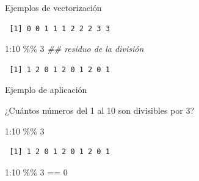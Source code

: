 \documentclass[
  ignorenonframetext,
  aspectratio=169,
  spanish,
]{beamer}
\newenvironment{Shaded}{\begin{snugshade}}{\end{snugshade}}
\newcommand{\DecValTok}[1]{\textcolor[rgb]{0.68,0.00,0.00}{#1}}
\newcommand{\DocumentationTok}[1]{\textcolor[rgb]{0.37,0.37,0.37}{\textit{#1}}}
\newcommand{\SpecialCharTok}[1]{\textcolor[rgb]{0.37,0.37,0.37}{#1}}
\begin{document}
\begin{frame}[fragile]{Ejemplos de vectorización}
\begin{verbatim}
 [1] 0 0 1 1 1 2 2 2 3 3
\end{verbatim}

\begin{Shaded}
\begin{Highlighting}[]
\DecValTok{1}\SpecialCharTok{:}\DecValTok{10} \SpecialCharTok{\%\%} \DecValTok{3} \DocumentationTok{\#\# residuo de la división}
\end{Highlighting}
\end{Shaded}

\begin{verbatim}
 [1] 1 2 0 1 2 0 1 2 0 1
\end{verbatim}
\end{frame}

\begin{frame}[fragile]{Ejemplo de aplicación}
\label{ejemplo-de-aplicaciuxf3n}
\begin{tcolorbox}[enhanced jigsaw, leftrule=.75mm, opacitybacktitle=0.6, opacityback=0, coltitle=black, breakable, colbacktitle=quarto-callout-important-color!10!white, colback=white, titlerule=0mm, bottomrule=.15mm, left=2mm, bottomtitle=1mm, colframe=quarto-callout-important-color-frame, toptitle=1mm, toprule=.15mm, title=\textcolor{quarto-callout-important-color}{\faExclamation}\hspace{0.5em}{Importante}, arc=.35mm, rightrule=.15mm]

¿Cuántos números del 1 al 10 son divisibles por 3?

\end{tcolorbox}

\begin{Shaded}
\begin{Highlighting}[]
\DecValTok{1}\SpecialCharTok{:}\DecValTok{10} \SpecialCharTok{\%\%} \DecValTok{3} 
\end{Highlighting}
\end{Shaded}

\begin{verbatim}
 [1] 1 2 0 1 2 0 1 2 0 1
\end{verbatim}

\begin{Shaded}
\begin{Highlighting}[]
\DecValTok{1}\SpecialCharTok{:}\DecValTok{10} \SpecialCharTok{\%\%} \DecValTok{3} \SpecialCharTok{==} \DecValTok{0} 
\end{Highlighting}
\end{Shaded}


\end{frame}
\end{document}
